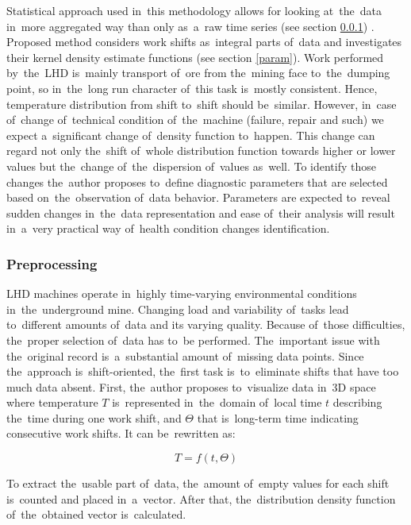 Statistical approach used in~this methodology allows for looking at~the~data in~more aggregated way than only as~a~raw time series (see section \ref{prep}) \cite{sikora2012regime,wylomanska2014signal,azami2012improved,rathi2006seeing,wylomanska2012identify}. Proposed method considers work shifts as~integral parts of~data and investigates their kernel density estimate functions (see section \ref{param}). Work performed by~the~LHD is~mainly transport of~ore from the~mining face to~the~dumping point, so in~the~long run character of~this task is~mostly consistent. Hence, temperature distribution from shift to~shift should be~similar. However, in~case of~change of~technical condition of~the~machine (failure, repair and such) we expect a~significant change of~density function to~happen. This change can regard not only the~shift of~whole distribution function towards higher or lower values but the~change of~the~dispersion of~values as~well. To identify those changes the~author proposes to~define diagnostic parameters that are selected based on~the~observation of~data behavior. Parameters are expected to~reveal sudden changes in~the~data representation and ease of~their analysis will result in~a~very practical way of~health condition changes identification.

\subsubsection{Preprocessing}\label{prep}

LHD machines operate in~highly time-varying environmental conditions in~the~underground mine. Changing load and variability of~tasks lead to~different amounts of~data and its varying quality. Because of~those difficulties, the~proper selection of~data has to~be performed. The~important issue with the~original record is~a~substantial amount of~missing data points. Since the~approach is~shift-oriented, the~first task is~to~eliminate shifts that have too much data absent. First, the~author proposes to~visualize data in~3D space where temperature $T$ is~represented in~the~domain of~local time $t$ describing the~time during one work shift, and $\Theta$ that is~long-term time indicating consecutive work shifts. It can be~rewritten as:

\begin{equation}
  T=f(t,\Theta)
\end{equation}

To extract the~usable part of~data, the~amount of~empty values for each shift is~counted and placed in~a~vector. After that, the~distribution density function of~the~obtained vector is~calculated. 

